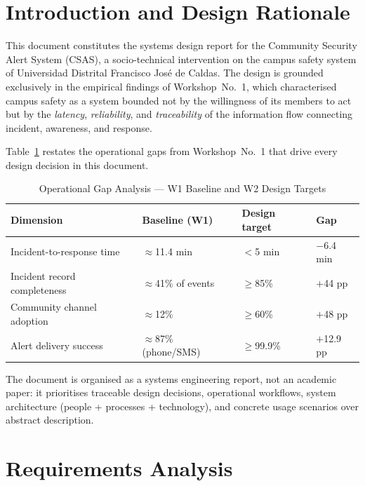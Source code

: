 \documentclass[12pt,a4paper]{article}
\begin{document}
\section{Introduction and Design Rationale}

This document constitutes the systems design report for the Community
Security Alert System (CSAS), a socio-technical intervention on the
campus safety system of Universidad Distrital Francisco José de Caldas.
The design is grounded exclusively in the empirical findings of
Workshop~No.~1, which characterised campus safety as a
system bounded not by the willingness of its members to act but by the
\emph{latency}, \emph{reliability}, and \emph{traceability} of the
information flow connecting incident, awareness, and response.

Table~\ref{tab:gaps} restates the operational gaps from Workshop~No.~1
that drive every design decision in this document.

\begin{table}[h]
\caption{Operational Gap Analysis --- W1 Baseline and W2 Design Targets}
\label{tab:gaps}
\centering
\begin{tabularx}{\textwidth}{lXXX}
\toprule
\textbf{Dimension} & \textbf{Baseline (W1)} & \textbf{Design target} & \textbf{Gap} \\
\midrule
Incident-to-response time & $\approx$11.4 min & $<$5 min & $-$6.4 min \\
Incident record completeness & $\approx$41\% of events & $\geq$85\% & $+$44 pp \\
Community channel adoption & $\approx$12\% & $\geq$60\% & $+$48 pp \\
Alert delivery success & $\approx$87\% (phone/SMS) & $\geq$99.9\% & $+$12.9 pp \\
\bottomrule
\end{tabularx}
\end{table}

The document is organised as a systems engineering report, not an
academic paper: it prioritises traceable design decisions, operational
workflows, system architecture (people + processes + technology), and
concrete usage scenarios over abstract description.

\section{Requirements Analysis}
\end{document}
